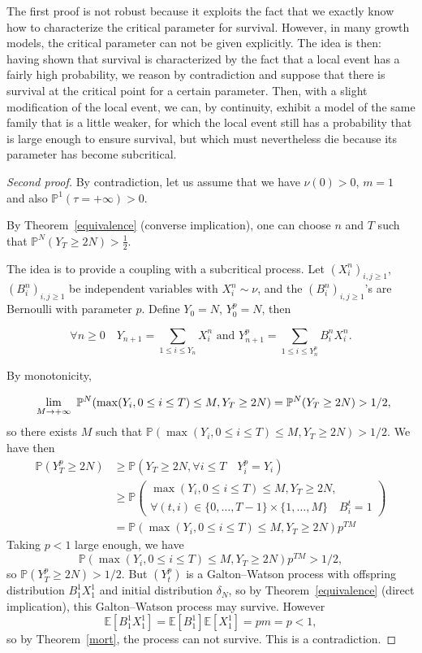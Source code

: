 \documentclass[svgnames]{amsart}
\newcommand{\E}{\ensuremath{\mathbb{E}}}
\renewcommand{\P}{\ensuremath{\mathbb{P}}}
\newcommand{\miniop}[3]{%
\renewcommand{\arraystretch}{0.6}
\begin{array}{c}
{\scriptstyle #1}\\
#2\\
{\scriptstyle #3}
\end{array}
\renewcommand{\arraystretch}{1}}
\newcommand{\1}{\mathbbo{1}}
\begin{document}
The first proof is not robust because it exploits the fact that we exactly know how to characterize the critical parameter for survival.
However, in many growth models, the critical parameter can not be given explicitly.
The idea is then: having shown that survival is characterized by the fact that a local event has a fairly high probability, we reason by contradiction and suppose that there is survival at the critical point for a certain parameter.
Then, with a slight modification of the local event, we can, by continuity, exhibit a model of the same family that is a little weaker, for which the local event still has a probability that is large enough to ensure survival, but which must nevertheless die because its parameter has become subcritical.

\begin{proof}[Second proof]
By contradiction, let us assume that we have $\nu(0)>0$, $m=1$ and also $\P^1(\tau=+\infty)>0$.


By Theorem~\ref{equivalence} (converse implication), one can choose $n$ and $T$ such that  $\P^N(Y_T\ge 2N)>\frac12$.

The idea is to provide a coupling with a subcritical process.
Let $(X_i^n)_{i,j\ge 1}$, $(B_i^n)_{i,j\ge 1}$ be independent variables with $X_i^n\sim \nu$,  and the $(B_i^n)_{i,j\ge 1}$'s are  Bernoulli with parameter $p$. Define $Y_0=N$, $Y^p_0=N$, then 

$$\forall n\ge 0\quad Y_{n+1}=\sum_{1\le i\le Y_n}X_i^n\text{ and }Y^p_{n+1}=\sum_{1\le i\le Y^p_n}B_i^n X_i^n.$$

By monotonicity,
$$\miniop{}{\lim}{M\to +\infty}\P^N( \max(Y_i,0\le i\le T)\le M,Y_T\ge 2N)=\P^N( Y_T\ge 2N)>1/2,$$
so there exists $M$ such that $\P( \max(Y_i,0\le i\le T)\le M,Y_T\ge 2N)>1/2$.
We have then
\begin{align*}
\P(Y^p_T\ge 2N)&\ge \P(Y_T\ge 2N,\forall i\le T\quad Y^p_i=Y_i)\\
& \ge \P\left( \begin{array}{l}\max(Y_i,0\le i\le T)\le M,Y_T\ge 2N,\\\forall (t,i)\in\{0,\dots, T-1\}\times\{1,\dots,M\} \quad B_i^t=1\end{array}\right)\\&=\P( \max(Y_i,0\le i\le T)\le M,Y_T\ge 2N)p^{TM}
\end{align*}
Taking $p<1$ large enough, we have $$\P( \max(Y_i,0\le i\le T)\le M,Y_T\ge 2N)p^{TM}>1/2,$$ so $\P(Y^p_T\ge 2N)>1/2$.
But $(Y^p_t)$ is a Galton--Watson process with offspring distribution $B_1^1X_1^1$ and initial distribution $\delta_N$, so by Theorem~\ref{equivalence} (direct implication), this Galton--Watson process may survive.
However $$\E[B_1^1X_1^1]=\E[B_1^1]\E[X_1^1]=pm=p<1,$$ so by Theorem~\ref{mort}, the process can not survive. This is a contradiction.

\end{proof}
\end{document}
